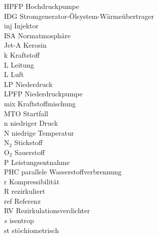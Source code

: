 \begin{tabbing}
    HPFP    \>  Hochdruckpumpe                                      \\
    IDG     \>  Stromgenerator-Ölsystem-Wärmeübertrager             \\
    inj     \>  Injektor                                            \\
    ISA     \>  Normatmosphäre                                      \\
    Jet-A   \>  Kerosin                                             \\
    k       \>  Kraftstoff                                          \\
    L       \>  Leitung                                             \\
    L       \>  Luft                                                \\
    LP      \>  Niederdruck                                         \\
    LPFP    \>  Niederdruckpumpe                                    \\
    mix     \>  Kraftstoffmischung                                  \\
    MTO     \>  Startfall                                           \\
    n       \>  niedriger Druck                                     \\
    N       \>  niedrige Temperatur                                 \\
    N$_2$   \>  Stickstoff                                          \\
    O$_2$   \>  Sauerstoff                                          \\
    P       \>  Leistungsentnahme                                   \\
    PHC     \>  parallele Wasserstoffverbrennung                    \\
    r       \>  Kompressibilität                                    \\
    R       \>  rezirkuliert                                        \\
    ref     \>  Referenz                                            \\
    RV      \>  Rezirkulationsverdichter                            \\
    $s$     \>  isentrop                                            \\
    st      \>  stöchiometrisch                                     \\

\end{tabbing}
